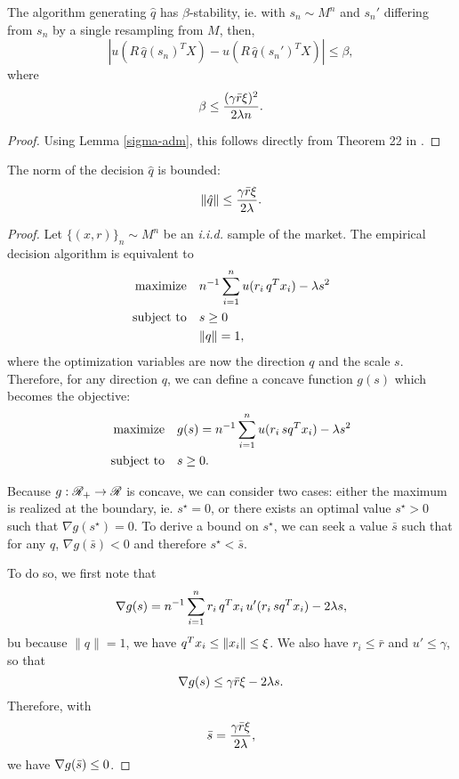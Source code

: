 \begin{lemma}
  \label{beta-bound}
  The algorithm generating $\hat q$ has $\beta$-stability, ie. with $s_n \sim M^n$ and
  $s_n'$ differing from $s_n$ by a single resampling from $M$, then, 
  \[
    |u(R\,\hat q(s_n)^T X) - u(R\,\hat q(s_n')^T X)| \leq \beta,
  \]
  where
  \[
    \beta \leq \frac{(\gamma\bar r\xi)^2}{2\lambda n}.
  \]
\end{lemma}
\begin{proof}
  Using Lemma \ref{sigma-adm}, this follows directly from Theorem 22 in
  \cite{bousquet2002stability}.
\end{proof}

\begin{lemma}
  \label{q-bound}
  The norm of the decision $\hat q$ is bounded:
  \[
    \|\hat q\| \leq \frac{\gamma\bar r\xi}{2\lambda}.
  \]
\end{lemma}
\begin{proof}
  Let $\{(x,r)\}_n \sim M^n$ be an \textit{i.i.d.} sample of the market. The empirical decision
  algorithm is equivalent to
  \begin{align*}
    \maximizeEquationSt{n^{-1}\sum_{i=1}^n u(r_i\,q^Tx_i) - \lambda s^2}[s\geq0\\,\|q\|=1],
  \end{align*}
  where the optimization variables are now the direction $q$ and the scale $s$. Therefore,
  for any direction $q$, we can define a concave function $g(s)$ which becomes the
  objective:
  \begin{align*}
    \maximizeEquationSt{g(s) = n^{-1}\sum_{i=1}^n u(r_i\,sq^Tx_i) - \lambda s^2}[s\geq 0].
  \end{align*}
  
  Because $g:\mathscr{R}_{+}\to\mathscr{R}$ is concave, we can consider two cases: either the maximum
  is realized at the boundary, ie. $s^\star=0$, or there exists an optimal value
  $s^\star > 0$ such that $\nabla g(s^\star)=0$. To derive a bound on $s^\star$, we can seek a
  value $\bar s$ such that for any $q$, $\nabla{}g(\bar s)<0$ and therefore $s^\star < \bar s$.

  To do so, we first note that 
  \[
    \nabla g(s) = n^{-1}\sum_{i=1}^nr_i\,q^Tx_i\,u'(r_i\,sq^Tx_i) - 2\lambda s,
  \]
  bu because $\|q\|=1$, we have $q^Tx_i\leq\|x_i\|\leq\xi$. We also have
  $r_i\leq \bar r$ and $u'\leq\gamma$, so that
  \[
    \nabla g(s) \leq \gamma\bar r\xi - 2\lambda s.
  \]
  Therefore, with
  \[
    \bar s = \frac{\gamma\bar r\xi}{2\lambda},
  \]
  we have $\nabla g(\bar s)\leq 0$. 
\end{proof}

